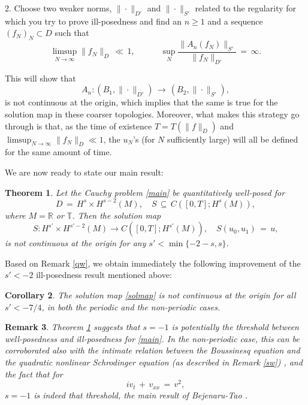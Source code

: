 \documentclass{amsart}
\newtheorem{theorem}{Theorem}[section]
\newtheorem{corollary}[theorem]{Corollary}
\newtheorem{remark}[theorem]{Remark}
\begin{document}
2. Choose two weaker norms, $\| \cdot\|_{D'}$ and $\| \cdot\|_{S'}$ related to the regularity for which you try to prove ill-posedness and find an $n\geq 1$ and a sequence $(f_N)_N\subset D$ such that
\begin{equation}
\limsup_{N\to \infty} \|f_N\|_D\,\ll\,1, \qquad \quad \sup_N \frac{\|A_n(f_N)\|_{S'}}{\|f_N\|_{D'}}\,=\,\infty.
\label{ip}
\end{equation}

This will show that 
\begin{equation}
A_n: (B_1,\|\cdot \|_{D'})\,\longrightarrow\,(B_2,\| \cdot\|_{S'}),
\end{equation} 
is not continuous at the origin, which implies that the same is true for the solution map in these coarser  topologies. Moreover, what makes this strategy go through is that, as the time of existence $T=T(\|f\|_D)$ and $\limsup_{N\to \infty} \|f_N\|_D \ll 1$, the $u_N$'s (for $N$ sufficiently large) will all be defined for the same amount of time.


We are now ready to state our main result:

\begin{theorem}
Let the Cauchy problem \eqref{main} be quantitatively well-posed for
\[
D\,=\,H^s \times H^{s-2}(M), \quad S\,\subseteq \,C([0,T]; H^s(M)), \]
where  $M=\mathbb{R}$ or $\mathbb{T}$. Then the solution map
\begin{equation}
S: H^{s'} \times H^{s'-2}(M) \to C([0,T]; H^{s'}(M)), \quad
S(u_0,u_1)\,=\,u,
\label{solmap}
\end{equation}
is not continuous at the origin for any $s'< \min\{-2-s, s\}$.
\label{mainth}
\end{theorem}

Based on Remark \ref{qw}, we obtain immediately the following improvement of the $s'<-2$ ill-posedness result mentioned above:

\begin{corollary}
The solution map \eqref{solmap} is not continuous at the origin for all $s'<-7/4$, in both the periodic and the non-periodic cases.
\end{corollary}

\begin{remark}
Theorem \ref{mainth} suggests that $s=-1$ is potentially the threshold between well-posedness and ill-posedness for \eqref{main}.  In the non-periodic case, this can be corroborated also with the intimate relation between the Boussinesq equation and the quadratic nonlinear Schrodinger equation (as described in Remark \ref{sw}) , and the fact that for 
\[
iv_t\,+\,v_{xx}\,=\,v^2,
\]
$s=-1$ is indeed that threshold, the main result of Bejenaru-Tao \cite{BT06}. 
\end{remark}
\end{document}
